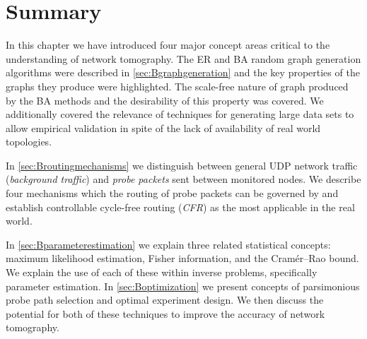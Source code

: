 \section{Summary}
In this chapter we have introduced four major concept areas critical to the understanding of network tomography. The ER and BA random graph generation algorithms were described in \cref{sec:Bgraphgeneration} and the key properties of the graphs they produce were highlighted. The scale-free nature of graph produced by the BA methods and the desirability of this property was covered. We additionally covered the relevance of techniques for generating large data sets to allow empirical validation in spite of the lack of availability of real world topologies.\par

In \cref{sec:Broutingmechanisms} we distinguish between general UDP network traffic (\textit{background traffic}) and \textit{probe packets} sent between monitored nodes. We describe four mechanisms which the routing of probe packets can be governed by and establish controllable cycle-free routing (\textit{CFR}) as the most applicable in the real world.\par

In \cref{sec:Bparameterestimation} we explain three related statistical concepts: maximum likelihood estimation, Fisher information, and the Cramér–Rao bound. We explain the use of each of these within inverse problems, specifically parameter estimation. In \cref{sec:Boptimization} we present concepts of parsimonious probe path selection and optimal experiment design. We then discuss the potential for both of these techniques to improve the accuracy of network tomography.